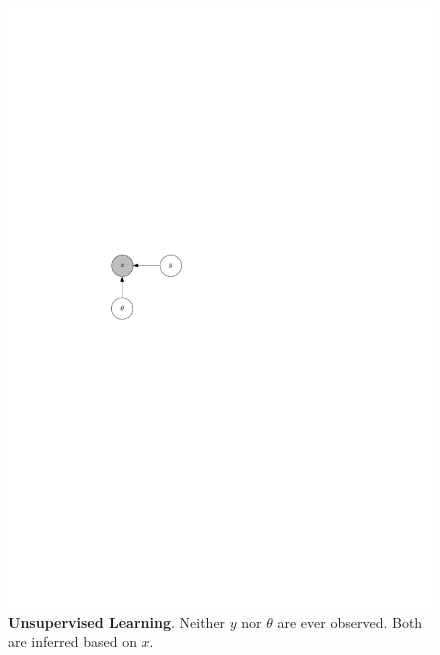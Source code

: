 \documentclass[12pt]{article}
\begin{document}
\begin{figure}
  \centering
  \includegraphics{unsupervised_train.pdf}
  \caption{{\bf Unsupervised Learning}.  Neither $y$ nor $\theta$ are ever observed.  Both are inferred based on $x$.}
\end{figure}
\end{document}
